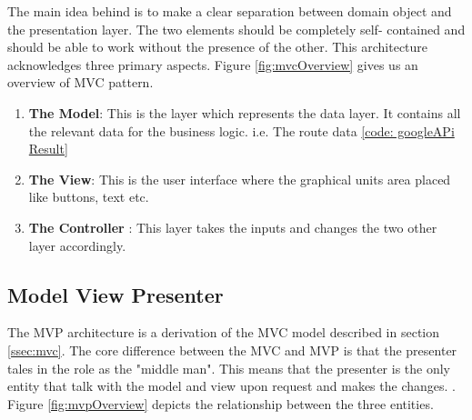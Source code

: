         \par
           The main idea behind is to make a clear separation between domain object and the presentation layer. The two elements should be completely self-
           contained and should be able to work without the presence of the other. This 
           architecture acknowledges three primary aspects. Figure \ref{fig:mvcOverview} 
           gives us an overview of MVC pattern.
           \begin{enumerate}
               \item 
                \textbf{The Model}: This is the layer which represents the data layer. It 
                contains all the relevant data for the business logic. i.e. 
                The route data \ref{code: googleAPi Result} 

               \item 
                \textbf{The View}: This is the user interface where the graphical units area
                placed like buttons, text etc.

               \item 
                \textbf{The Controller} : This layer takes the inputs and changes the two other
                layer accordingly.
           \end{enumerate} 

        

    \subsection{Model View Presenter}
        The MVP architecture is a derivation of the MVC model described in section 
        \ref{ssec:mvc}. The core difference between the MVC and MVP is that the presenter
        tales in the role as the "middle man". This means that the presenter is the only
        entity that talk with the model and view upon request and makes the changes. 
        \cite{Potel}. Figure \ref{fig:mvpOverview} depicts the relationship between the 
        three entities.

